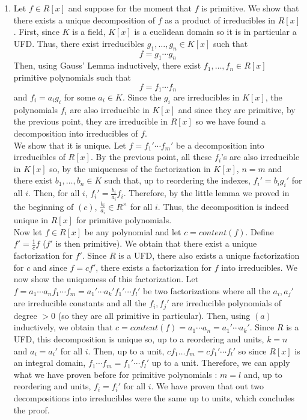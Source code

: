 \documentclass[12pt,a4paper]{article}
\begin{document}
\begin{enumerate}
\item Let $f \in R[x]$ and suppose for the moment that $f$ is primitive. We show that there exists a unique decomposition of $f$ as a product of irreducibles in $R[x]$. First, since $K$ is a field, $K[x]$ is a euclidean domain so it is in particular a UFD. Thus, there exist irreducibles $g_1, \dots, g_n \in K[x]$ such that \[f = g_1 \cdots g_n\] Then, using Gauss' Lemma inductively, there exist $f_1, \dots, f_n \in R[x]$ primitive polynomials such that \[f = f_1 \cdots f_n \] and $f_i = a_ig_i$ for some $a_i \in K$. Since the $g_i$ are irreducibles in $K[x]$, the polynomials $f_i$ are also irreducible in $K[x]$ and since they are primitive, by the previous point, they are irreducible in $R[x]$ so we have found a decomposition into irreducibles of $f$. \\ We show that it is unique. Let $f = f_1' \cdots f_m'$ be a decomposition into irreducibles of $R[x]$. By the previous point, all these $f_i$'s are also irreducible in $K[x]$ so, by the uniqueness of the factorization in $K[x]$, $n = m$ and there exist $b_1, \dots, b_n \in K$ such that, up to reordering the indexes, $f_i' = b_ig_i'$ for all $i$. Then, for all $i$, $f_i' = \frac{b_i}{a_i}f_i$. Therefore, by the little lemma we proved in the beginning of $(c)$, $\frac{b_i}{a_i} \in R^\times$ for all $i$. Thus, the decomposition is indeed unique in $R[x]$ for primitive polynomials. \\
Now let $f \in R[x]$ be any polynomial and let $c = content(f)$. Define $f' = \frac{1}{c}f$ ($f'$ is then primitive). We obtain that there exist a unique factorization for $f'$. Since $R$ is a UFD, there also exists a unique factorization for $c$ and since $f = cf'$, there exists a factorization for $f$ into irreducibles. We now show the uniqueness of this factorization. Let $f = a_1 \cdots a_nf_1 \cdots f_m = a_1' \cdots a_k' f_1' \cdots f_l'$ be two factorizations where all the $a_i, a_j'$ are irreducible constants and all the $f_i, f_j'$ are irreducible polynomials of degree $> 0$ (so they are all primitive in particular). Then, using $(a)$ inductively, we obtain that $c = content(f) = a_1 \cdots a_n = a_1' \cdots a_k'$. Since $R$ is a UFD, this decomposition is unique so, up to a reordering and units, $k = n$ and $a_i = a_i'$ for all $i$. Then, up to a unit, $cf_1 \dots f_m = cf_1' \cdots f_l'$ so since $R[x]$ is an integral domain, $f_1 \cdots f_m = f_1' \cdots f_l'$ up to a unit. Therefore, we can apply what we have proven before for primitive polynomials : $m = l$ and, up to reordering and units, $f_i = f_i'$ for all $i$. We have proven that out two decompositions into irreducibles were the same up to units, which concludes the proof.
\end{enumerate}
\end{document}
